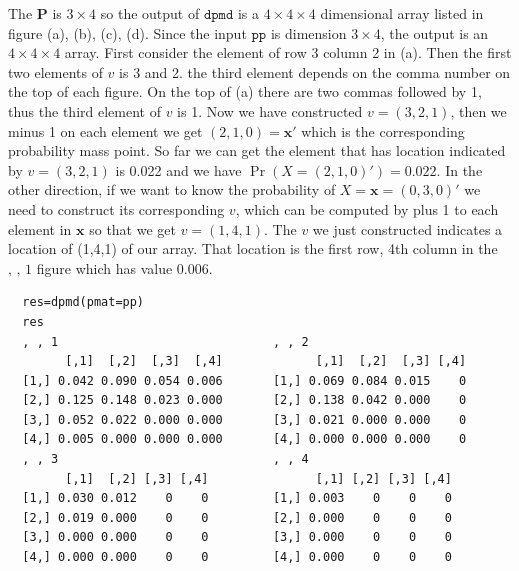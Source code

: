 \documentclass[12pt]{article}
\newcommand{\Pmat}{\mathbf{P}}
\newcommand{\xvec}{\boldsymbol{x}}
\newcommand{\code}{\texttt}
\begin{document}
The $\Pmat$ is $3 \times 4$ so the output of $\code{dpmd}$ is a $4 \times 4 \times 4$ dimensional array listed in figure (a), (b), (c), (d). Since the input $\code{pp}$ is dimension $3 \times 4$, the output is an $4 \times 4 \times 4$ array. First consider the element of row 3 column 2 in (a). Then the first two elements of $v$ is 3 and 2. the third element depends on the comma number on the top of each figure. On the top of (a) there are two commas followed by 1, thus the third element of $v$ is 1. Now we have constructed $v = (3,2,1)$, then we minus 1 on each element we get $(2,1,0)=\xvec'$ which is the corresponding probability mass point. So far we can get the element that has location indicated by $v=(3,2,1)$ is 0.022 and we have $\Pr(X=(2,1,0)')=0.022$. In the other direction, if we want to know the probability of $X=\xvec=(0,3,0)'$ we need to construct its corresponding $v$, which can be computed by plus 1 to each element in $\xvec$ so that we get $v=(1,4,1)$. The $v$ we just constructed indicates a location of (1,4,1) of our array. That location is the first row, 4th column in the $\text{, , 1}$ figure which has value 0.006.

\begin{verbatim}
  res=dpmd(pmat=pp)
  res
  , , 1                              , , 2
        [,1]  [,2]  [,3]  [,4]             [,1]  [,2]  [,3] [,4] 
  [1,] 0.042 0.090 0.054 0.006       [1,] 0.069 0.084 0.015    0 
  [2,] 0.125 0.148 0.023 0.000       [2,] 0.138 0.042 0.000    0 
  [3,] 0.052 0.022 0.000 0.000       [3,] 0.021 0.000 0.000    0 
  [4,] 0.005 0.000 0.000 0.000       [4,] 0.000 0.000 0.000    0 
  , , 3                              , , 4                     
        [,1]  [,2] [,3] [,4]               [,1] [,2] [,3] [,4]
  [1,] 0.030 0.012    0    0         [1,] 0.003    0    0    0 
  [2,] 0.019 0.000    0    0         [2,] 0.000    0    0    0 
  [3,] 0.000 0.000    0    0         [3,] 0.000    0    0    0 
  [4,] 0.000 0.000    0    0         [4,] 0.000    0    0    0 
\end{verbatim}


\end{document}
